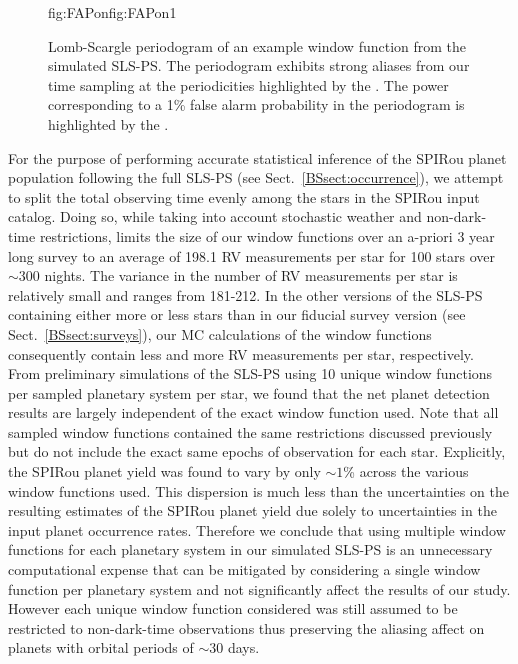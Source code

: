 \begin{figure}
\begin{ocg}{fig:FAPon}{fig:FAPon}{1}
  \end{ocg}
  \hspace{-0.8\hsize}%
  \caption[Lomb-Scargle periodogram of an expected SPIRou window function during the SLS-PS.]
    {\small Lomb-Scargle periodogram of an example window function from the simulated SLS-PS.
    The periodogram exhibits strong aliases from our time sampling at the periodicities
    highlighted by the 
    . The power
    corresponding to a 1\% false alarm probability in the periodogram is highlighted by the  
    .}
  \label{BSfig:wfs}
\end{figure}

For the purpose of performing accurate statistical inference of the SPIRou planet population
following the full SLS-PS (see Sect.~\ref{BSsect:occurrence}),
we attempt to split the total observing time evenly among the stars in the
SPIRou input catalog. Doing so, while taking into account stochastic weather and non-dark-time restrictions,
limits the size of our window functions over an a-priori 3 year long survey to an average of
198.1 RV measurements per star for 100 stars over $\sim 300$ nights. The variance in the number of RV
measurements per star is relatively small and ranges from 181-212. 
In the other versions of the SLS-PS containing either more or less stars than in our fiducial survey version
(see Sect.~\ref{BSsect:surveys}),
our MC calculations of the window functions consequently contain less and more RV measurements per star, respectively. \\

From preliminary simulations of the SLS-PS using 10 unique window functions per sampled planetary system per star,
we found that the net planet detection results are largely independent of the exact window function used. Note that
all sampled window functions contained the same restrictions discussed previously but do not include the exact
same epochs of observation for each star. Explicitly,
the SPIRou planet yield was found to vary by only $\sim 1$\% across the various window functions used.
This dispersion is much
less than the uncertainties on the resulting estimates of the SPIRou planet yield due solely to uncertainties in
the input planet occurrence rates. Therefore we conclude that using multiple window functions for each planetary
system in our simulated
SLS-PS is an unnecessary computational expense that can be mitigated by considering a single window function
per planetary system and not significantly affect the results of our study. However each unique window function considered
was still assumed to be restricted to non-dark-time observations thus preserving the aliasing affect on planets with
orbital periods of $\sim 30$ days.


